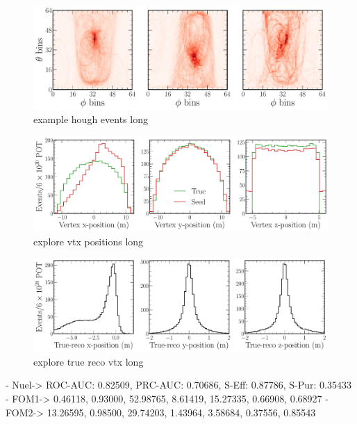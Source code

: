 \begin{figure} %
    \includegraphics[width=\textwidth]{diagrams/6-cvn/chipsnet/explore_hough_events.pdf}
    \caption[example hough events short]
    {example hough events long}
    \label{fig:example_hough_events}
\end{figure}

\begin{figure} %
    \includegraphics[width=\textwidth]{diagrams/6-cvn/chipsnet/explore_vtx_positions.pdf}
    \caption[explore vtx positions short]
    {explore vtx positions long}
    \label{fig:explore_vtx_positions}
\end{figure}

\begin{figure} %
    \includegraphics[width=\textwidth]{diagrams/6-cvn/chipsnet/explore_true_reco_vtx.pdf}
    \caption[explore true reco vtx short]
    {explore true reco vtx long}
    \label{fig:explore_true_reco_vtx}
\end{figure}

- Nuel-> ROC-AUC: 0.82509, PRC-AUC: 0.70686, S-Eff: 0.87786, S-Pur: 0.35433
- FOM1-> 0.46118, 0.93000, 52.98765, 8.61419, 15.27335, 0.66908, 0.68927
- FOM2-> 13.26595, 0.98500, 29.74203, 1.43964, 3.58684, 0.37556, 0.85543

